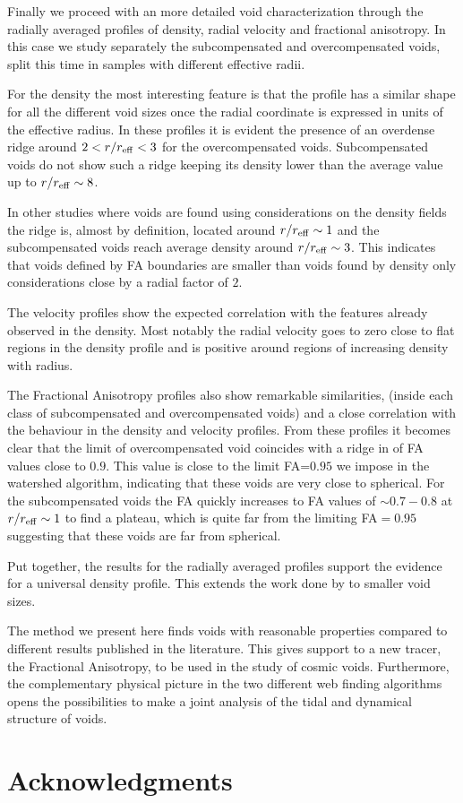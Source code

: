 \documentclass[a4,useAMS,usenatbib,usegraphicx]{mn2e}
\begin{document}
Finally we proceed with an more detailed void characterization
through the radially averaged profiles of density, radial velocity and
fractional anisotropy. 
In this case we study separately the subcompensated and
overcompensated voids, split this time in samples with different
effective radii. 

For the density the most interesting feature is that the  profile has
a similar shape for all the different void sizes once the radial
coordinate is expressed in units of the effective radius.  
In these profiles it is evident the presence of an overdense ridge
around $2<r/r_{\rm eff}<3$ for the overcompensated voids.
Subcompensated voids do not show such a ridge keeping its density
lower than the average value up to $r/r_{\rm eff}\sim 8$.

In other studies where voids are found using considerations on the
density fields the ridge is, almost by definition, located around
$r/r_{\rm eff}\sim 1$ and the subcompensated voids reach average
density around $r/r_{\rm eff}\sim 3$. 
This indicates that voids defined by FA boundaries are smaller  than
voids found by density only considerations close by a radial factor of
$2$.   

The velocity profiles show the expected correlation with the features
already observed in the density.
Most notably the radial velocity goes to zero close to flat regions in
the density profile and is positive around regions of increasing
density with radius.  

The Fractional Anisotropy profiles also show remarkable similarities,
(inside each class of subcompensated and overcompensated voids)
and a close correlation with the behaviour in the density and velocity
profiles. 
From these profiles it becomes clear that the limit of overcompensated
void coincides with a ridge in of FA values close to $0.9$. 
This value is close to the limit FA=$0.95$ we impose in the watershed
algorithm, indicating that these voids are very close to spherical.
For the subcompensated voids the FA quickly increases to FA values of 
$\sim 0.7-0.8$ at $r/r_{\rm eff}\sim 1$ to find a plateau, which is
quite far from the limiting FA$=0.95$ suggesting that these voids are
far from spherical. 

Put together, the results for the radially averaged profiles support the 
evidence for a universal density profile.  
This extends the work done
by \cite{Hamaus14} to smaller void sizes.  

The method we present here finds voids with reasonable properties
compared to different results published in the literature. 
This gives support to a new tracer, the Fractional Anisotropy, to be
used in the study of cosmic voids. 
Furthermore, the complementary physical picture in the two different
web finding algorithms opens the possibilities to make a joint
analysis of the tidal and dynamical structure of voids. 


\section*{Acknowledgments}  



\end{document}
